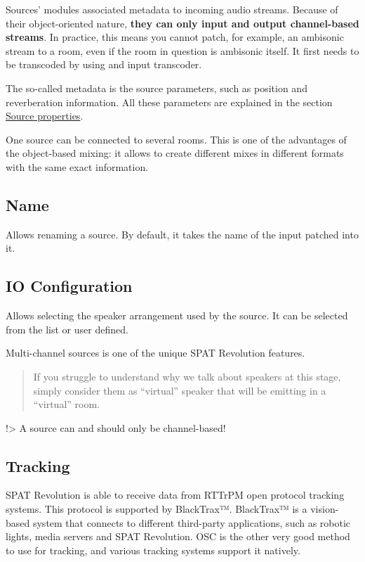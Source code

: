 \documentclass[
  letterpaper,
  DIV=11,
  numbers=noendperiod]{scrreport}
\begin{document}
Sources' modules associated metadata to incoming audio streams. Because
of their object-oriented nature, \textbf{they can only input and output
channel-based streams}. In practice, this means you cannot patch, for
example, an ambisonic stream to a room, even if the room in question is
ambisonic itself. It first needs to be transcoded by using and input
transcoder.

The so-called metadata is the source parameters, such as position and
reverberation information. All these parameters are explained in the
section \href{Spat_Environment_Source.md}{Source properties}.

One source can be connected to several rooms. This is one of the
advantages of the object-based mixing: it allows to create different
mixes in different formats with the same exact information.

\hypertarget{name-1}{%
\subsection{Name}\label{name-1}}

Allows renaming a source. By default, it takes the name of the input
patched into it.

\hypertarget{io-configuration}{%
\subsection{IO Configuration}\label{io-configuration}}

Allows selecting the speaker arrangement used by the source. It can be
selected from the list or user defined.

Multi-channel sources is one of the unique SPAT Revolution features.

\begin{quote}
If you struggle to understand why we talk about speakers at this stage,
simply consider them as ``virtual'' speaker that will be emitting in a
``virtual'' room.
\end{quote}

!\textgreater{} A source can and should only be channel-based!

\hypertarget{tracking}{%
\subsection{Tracking}\label{tracking}}

SPAT Revolution is able to receive data from RTTrPM open protocol
tracking systems. This protocol is supported by BlackTrax™. BlackTrax™
is a vision-based system that connects to different third-party
applications, such as robotic lights, media servers and SPAT Revolution.
OSC is the other very good method to use for tracking, and various
tracking systems support it natively.
\end{document}
